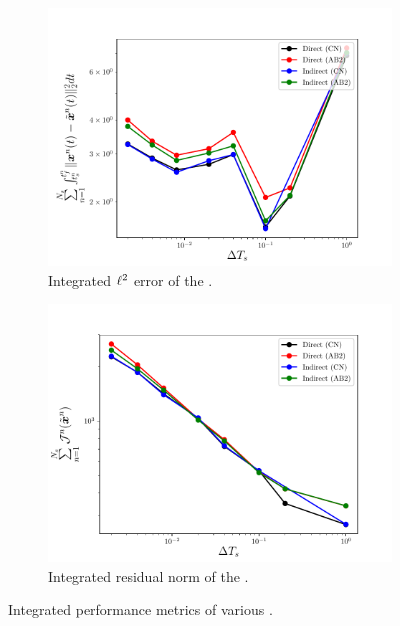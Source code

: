 \begin{figure}
\begin{center}
\begin{subfigure}[t]{0.45\textwidth}
\includegraphics[width=1.\linewidth]{figs/sod/error_vs_window.pdf}
\caption{Integrated $\ell^2$ error of the \methodAcronymROMs.}
\label{fig:sod_error_methods_a}
\end{subfigure}
\begin{subfigure}[t]{0.45\textwidth}
\includegraphics[width=1.\linewidth]{figs/sod/objective_vs_window.pdf}
\caption{Integrated residual norm of the \methodAcronymROMs.} 
\label{fig:sod_error_methods_b}
\end{subfigure}
\caption{Integrated performance metrics of various \methodAcronymROMs.} 
\label{fig:sod_error_methods}
\end{center}
\end{figure}


